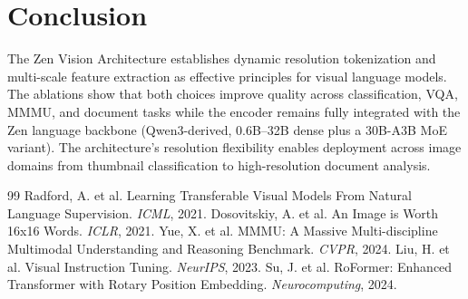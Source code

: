 \documentclass[11pt,a4paper]{article}
\begin{document}
\section{Conclusion}

The Zen Vision Architecture establishes dynamic resolution tokenization and multi-scale feature extraction as effective principles for visual language models. The ablations show that both choices improve quality across classification, VQA, MMMU, and document tasks while the encoder remains fully integrated with the Zen language backbone (Qwen3-derived, 0.6B--32B dense plus a 30B-A3B MoE variant). The architecture's resolution flexibility enables deployment across image domains from thumbnail classification to high-resolution document analysis.

\begin{thebibliography}{99}
 Radford, A. et al. Learning Transferable Visual Models From Natural Language Supervision. \textit{ICML}, 2021.
 Dosovitskiy, A. et al. An Image is Worth 16x16 Words. \textit{ICLR}, 2021.
 Yue, X. et al. MMMU: A Massive Multi-discipline Multimodal Understanding and Reasoning Benchmark. \textit{CVPR}, 2024.
 Liu, H. et al. Visual Instruction Tuning. \textit{NeurIPS}, 2023.
 Su, J. et al. RoFormer: Enhanced Transformer with Rotary Position Embedding. \textit{Neurocomputing}, 2024.
\end{thebibliography}
\end{document}

